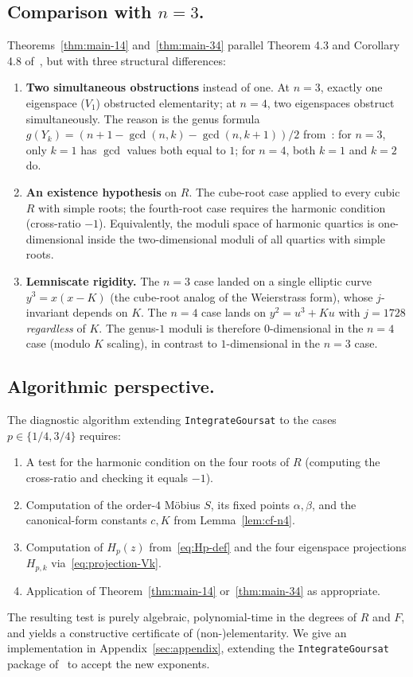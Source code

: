\documentclass[11pt,a4paper]{article}
\theoremstyle{plain}
\theoremstyle{definition}
\theoremstyle{remark}
\begin{document}
\subsection*{Comparison with $n = 3$.}
Theorems~\ref{thm:main-14} and~\ref{thm:main-34} parallel Theorem 4.3 and Corollary 4.8 of~\cite{GoursatCubic}, but with three structural differences:
\begin{enumerate}
\item \textbf{Two simultaneous obstructions} instead of one. At $n = 3$, exactly one eigenspace ($V_1$) obstructed elementarity; at $n = 4$, two eigenspaces obstruct simultaneously. The reason is the genus formula $g(Y_k) = (n + 1 - \gcd(n, k) - \gcd(n, k+1))/2$ from~\cite{GoursatCubic}: for $n = 3$, only $k = 1$ has $\gcd$ values both equal to $1$; for $n = 4$, both $k = 1$ and $k = 2$ do.
\item \textbf{An existence hypothesis} on $R$. The cube-root case applied to every cubic $R$ with simple roots; the fourth-root case requires the harmonic condition (cross-ratio $-1$). Equivalently, the moduli space of harmonic quartics is one-dimensional inside the two-dimensional moduli of all quartics with simple roots.
\item \textbf{Lemniscate rigidity.} The $n = 3$ case landed on a single elliptic curve $y^3 = x(x - K)$ (the cube-root analog of the Weierstrass form), whose $j$-invariant depends on $K$. The $n = 4$ case lands on $y^2 = u^3 + K u$ with $j = 1728$ \emph{regardless} of $K$. The genus-$1$ moduli is therefore $0$-dimensional in the $n = 4$ case (modulo $K$ scaling), in contrast to $1$-dimensional in the $n = 3$ case.
\end{enumerate}

\subsection*{Algorithmic perspective.}
The diagnostic algorithm extending \texttt{IntegrateGoursat} to the cases $p \in \{1/4, 3/4\}$ requires:
\begin{enumerate}
  \item A test for the harmonic condition on the four roots of $R$ (computing the cross-ratio and checking it equals $-1$).
  \item Computation of the order-$4$ Möbius $S$, its fixed points $\alpha, \beta$, and the canonical-form constants $c, K$ from Lemma~\ref{lem:cf-n4}.
  \item Computation of $H_p(z)$ from~\eqref{eq:Hp-def} and the four eigenspace projections $H_{p, k}$ via~\eqref{eq:projection-Vk}.
  \item Application of Theorem~\ref{thm:main-14} or~\ref{thm:main-34} as appropriate.
\end{enumerate}
The resulting test is purely algebraic, polynomial-time in the degrees of $R$ and $F$, and yields a constructive certificate of (non-)elementarity. We give an implementation in Appendix~\ref{sec:appendix}, extending the \texttt{IntegrateGoursat} package of~\cite{GoursatCubic} to accept the new exponents.
\end{document}

